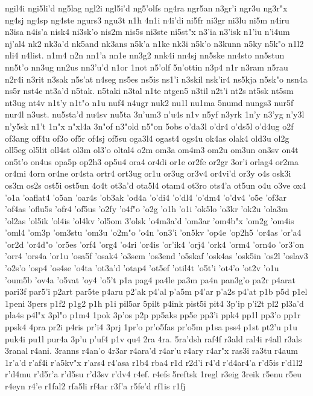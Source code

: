 {ngil4i
ngi5li'd
ng5lag
ngl2i
ngl5i'd
ng5'olfs
ng4ra
ngr5an
n3gr'i
ngr3u
ng3r"x
ng4sj
ng4sp
ng4ste
ngurs3
ngu3t
n1h
4n1i
n4i'di
ni5fr
ni3gr
ni3lu
ni5m
n4iru
n3isa
n4is'a
nisk4
ni3sk'o
nis2m
nis5s
ni3ste
ni5st"x
n3'ia
n3'isk
n1'iu
n'i4um
nj'al4
nk2
nk3a'd
nk5and
nk3ans
n5k'a
n1ke
nk3i
n5k'o
n3kunn
n5ky
n5k"o
n1l2
nli4
n4list.
n1m4
n2n
nn1'a
nn1e
nn3g2
nnk4i
nn4sj
nn5ske
nn4sto
nn5stun
nn5t'o
nn3ug
nn2us
nn3'u'd
n1or
1not
n5'olf
5n'ottin
n3p4
n1r
n3ram
n5rau
n2r4i
n3rit
n3sak
n5s'at
n4seg
ns5es
ns5is
ns1'i
n3skil
nsk'ir4
ns5kja
n5sk"o
nsn4a
ns5r
nst4e
nt3a'd
n5tak.
n5taki
n3tal
n1te
ntgen5
n3til
n2t'i
nt2s
nt5sk
nt5sm
nt3ug
nt4v
n1t'y
n1t"o
n1u
nuf4
n4ugr
nuk2
nu1l
nu1ma
5numd
nungs3
nur5f
nur4l
n3ust.
nu5sta'd
nu4sv
nu5ta
3n'um3
n'u4s
n1v
n5yf
n3yrk
1n'y
n3'yg
n'y3l
n'y5sk
n1't
1n"x
n"xl4a
3n"of
n3"old
n5"on
5obs
o'da3l
o'dr4
o'ds5l
o'd4ug
o2f
of3ang
off4u
of3o
of5r
of4sj
of5su
oga3l4
ogast4
ogs4u
ok4as
olak4
old3u
ol2g
oll5eg
ol5lit
oll4st
ol3m
ol3'o
oltal4
o2m
om3a
om4m3
om2u
om3un
on3sv
on4t
on5t'o
on4us
opa5p
op2h3
op5u4
ora4
or4di
or1e
or2fe
or2gr
3or'i
orlag4
or2ma
or4mi
4orn
or4ne
or4sta
ortr4
ort3ug
or1u
or3ug
or3v4
or4vi'd
or3y
o4s
osk3i
os3m
os2s
ost5i
ost5un
4o4t
ot3a'd
ota5l4
otam4
ot3ro
ots4'a
ot5un
o4u
o3ve
ox4
'o1a
'oaflat4
'o5an
'oar4s
'ob3ak
'od4a
'o'di4
'o'dl4
'o'dm4
'o'dv4
'o5e
'of3ar
'of4as
'oflu5s
'ofr4
'of5us
'o2fy
'o4f"o
'o2g
'o1h
'o1i
'ok5lo
'o3kr
'ok2u
'ola3m
'ol2as
'ol5ik
'ol4is
'ol4kv
'ol5om
3'olsk
'o4m3a'd
'om3ar
'om4b"x
'om2g
'om4is
'oml4
'om3p
'om3stu
'om3u
'o2m"o
'o4n
'on3'i
'on5kv
'op4e
'op2h5
'or4as
'or'a4
'or2d
'or4d"o
'or5es
'orf4
'org4
'o4ri
'or4is
'or'ik4
'orj4
'ork4
'orm4
'orn4o
'or3'on
'orr4
'ors4a
'or1u
'osa5f
'osak4
'o3sem
'os3end
'o5skaf
'osk4as
'osk5in
'os2l
'oslav3
'o2s'o
'osp4
'os4se
'o4ta
'ot3a'd
'otap4
'ot5ef
'otil4t
'o5t'i
'ot4'o
'ot2v
'o1u
'oum5b
'ov4a
'o5vat
'oy4
'o5't
p1a
pag4
pa4le
pa3m
pa4n
pan3g'o
pa2r
p4arat
pari3f
par5'i
p2art
par5te
p4aru
p2'ak
p4'al
p'a5m
p4'ar
p'a2s
p4'at
p1b
p5d
p1el
1peni
3pers
p1f2
p1g2
p1h
p1i
pil5ar
5pilt
p4ink
pist5i
pit4
3p'ip
p'i2t
pl2
pl3a'd
pla4s
p4l"x
3pl"o
p1m4
1pok
3p'os
p2p
pp5aks
pp5e
pp3'i
ppk4
pp1l
pp3'o
pp1r
ppsk4
4pra
pr2i
p4ris
pr'i4
3prj
1pr'o
pr'o5fas
pr'o5m
p1sa
pss4
p1st
pt2'u
p1u
puk4i
pu1l
pur4a
3p'u
p'uf4
p1v
qu4
2ra
4ra.
5ra'dsh
raf4f
r3ald
ral4i
r4all
r3als
3ranal
r4ani.
3ranns
r4an'o
4r3ar
r4ara'd
r4ar'u
r4ary
r4ar"x
ras3i
ra3tu
r4aum
1r'a'd
r'af4i
r'a5kv"x
r'ars4
r4'asa
r1b4
rba4
r1d
r2d'i
r4'd
r'd4ar4'a
r'd5is
r'd1l2
r'd4mu
r'd5r'a
r'd5su
r'd3sv
r'dv4
r4ef.
r4efs
5reftsk
1regl
r3eig
3reik
r5enu
r5eu
r4eyn
r4'e
r1fal2
rfa5li
rf4ar
r3f'a
r5fe'd
rf1is
r1fj
}

